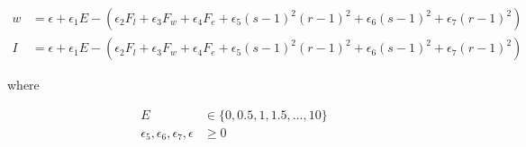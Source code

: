 \begin{equation}
	\label{eq:PotentialSurfaceEquation}
	\begin{split}
		w & =\epsilon+\epsilon_1 E-\left( 
			\epsilon_2 F_l+\epsilon_3 F_w+\epsilon_4 F_e+\epsilon_5 (s-1)^2(r-1)^2+\epsilon_6 (s-1)^2+\epsilon_7 (r-1)^2
		\right) \\
		I & =\epsilon+\epsilon_1 E-\left( 
			\epsilon_2 F_l+\epsilon_3 F_w+\epsilon_4 F_e+\epsilon_5 (s-1)^2(r-1)^2+\epsilon_6 (s-1)^2+\epsilon_7 (r-1)^2
		\right)
	\end{split}
\end{equation}
\centerline{where}
\begin{equation*}
    \begin{split}
        E & \in \{ 0,0.5,1,1.5,...,10 \} \\
        \epsilon_5,\epsilon_6,\epsilon_7,\epsilon & \ge 0 \\
    \end{split}
\end{equation*}




